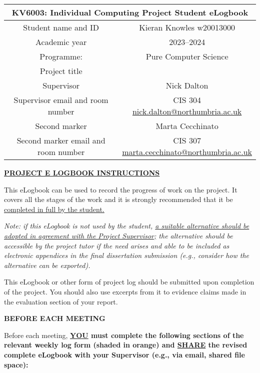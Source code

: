 \documentclass[../CHEFCookingHelperForEveryonesFridge.tex]{subfiles}
\begin{document}
\begin{table}[h!]
    \centering
    \begin{tabular}{|c|c|}
        \hline
        \multicolumn{2}{|c|}{KV6003: Individual Computing Project Student eLogbook} \\\hline
        Student name and ID & Kieran Knowles w20013000 \\\hline
        Academic year & 2023--2024 \\\hline
        Programme: & Pure Computer Science \\\hline
        Project title & \chef{} \\\hline
        Supervisor & Nick Dalton \\\hline
        Supervisor email and room number & \makecell[c]{
            CIS 304 \\
            \href{mailto:nick.dalton@northumbria.ac.uk}{nick.dalton@northumbria.ac.uk}
        } \\\hline
        Second marker & Marta Cecchinato \\\hline
        Second marker email and room number & \makecell[c]{
            CIS 307 \\
            \href{mailto:marta.cecchinato@northumbria.ac.uk}{marta.cecchinato@northumbria.ac.uk}
        } \\\hline
    \end{tabular}
\end{table}

\textbf{\underline{PROJECT E LOGBOOK INSTRUCTIONS}}

This eLogbook can be used to record the progress of work on the project. It covers all the stages of the
work and it is strongly recommended that it be \ul{completed in full by the student.}

\textit{
    Note: if this eLogbook is not used by the student, \ul{a suitable alternative should be adopted in agreement with
    the Project Supervisor;} the alternative should be accessible by the project tutor if the need arises and able
    to be included as electronic appendices in the final dissertation submission (e.g., consider how the alternative
    can be exported).
}

This eLogbook or other form of project log should be submitted upon completion of the project.
You should also use excerpts from it to evidence claims made in the evaluation section of your report.

\textbf{BEFORE EACH MEETING}

Before each meeting, \textbf{\ul{YOU} must complete the following sections of the relevant weekly log form
(\colorbox{\logbookshadecolour}{shaded in orange}) and \ul{SHARE} the revised complete eLogbook with your Supervisor
(e.g., via email, shared file space):}
\end{document}
